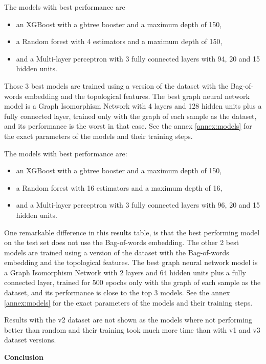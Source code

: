 The models with best performance are
\begin{itemize} 
  \item an XGBoost with a gbtree booster and a maximum depth of 150, 
  \item a Random forest with 4 estimators and a maximum depth of 150, 
  \item and a Multi-layer perceptron with 3 fully connected layers with 94, 20 and 15 hidden units. 
\end{itemize}
Those 3 best models are trained using a version of the dataset with the Bag-of-words embedding and the topological features. The best graph neural network model is a Graph Isomorphism Network with 4 layers and 128 hidden units plus  a fully connected layer, trained only with the graph of each sample as the dataset, and its performance is the worst in that case. See the annex \ref{annex:models} for the exact parameters of the models and their training steps.







The models with best performance are:
\begin{itemize} 
  \item an XGBoost with a gbtree booster and a maximum depth of 150, 
  \item a Random forest with 16 estimators and a maximum depth of 16, 
  \item and a Multi-layer perceptron with 3 fully connected layers with 96, 20 and 15 hidden units. 
\end{itemize} 
One remarkable difference in this results table, is that the best performing model on the test set does not use the Bag-of-words embedding. The other 2 best models are trained using a version of the dataset with the Bag-of-words embedding and the topological features. The best graph neural network model is a Graph Isomorphism Network with 2 layers and 64 hidden units plus  a fully connected layer, trained for 500 epochs only with the graph of each sample as the dataset, and its performance is close to the top 3 models. See the annex \ref{annex:models} for the exact parameters of the models and their training steps.



Results with the v2 dataset are not shown as the models where not performing better than random and their training took much more time than with v1 and v3 dataset versions.

\textbf{Conclusion}

